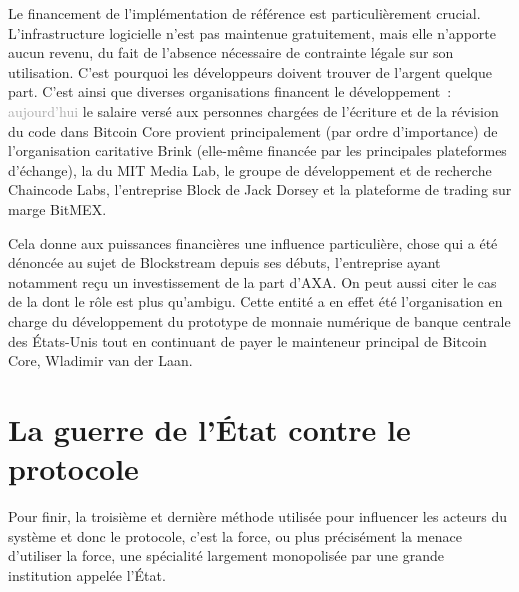 Le financement de l'implémentation de référence est particulièrement crucial. L'infrastructure logicielle n'est pas maintenue gratuitement, mais elle n'apporte aucun revenu, du fait de l'absence nécessaire de contrainte légale sur son utilisation. C'est pourquoi les développeurs doivent trouver de l'argent quelque part. C'est ainsi que diverses organisations financent le développement~: \textcolor{darkgray}{aujourd'hui} le salaire versé aux personnes chargées de l'écriture et de la révision du code dans Bitcoin Core provient principalement (par ordre d'importance) de l'organisation caritative Brink (elle-même financée par les principales plateformes d'échange), la  du MIT Media Lab, le groupe de développement et de recherche Chaincode Labs, l'entreprise Block de Jack Dorsey et la plateforme de trading sur marge BitMEX. %

Cela donne aux puissances financières une influence particulière, chose qui a été dénoncée au sujet de Blockstream depuis ses débuts, l'entreprise ayant notamment reçu un investissement de la part d'AXA. On peut aussi citer le cas de la  dont le rôle est plus qu'ambigu. Cette entité a en effet été l'organisation en charge du développement du prototype de monnaie numérique de banque centrale des États-Unis tout en continuant de payer le mainteneur principal de Bitcoin Core, Wladimir van der Laan.

\section*{La guerre de l'État contre le protocole} %

Pour finir, la troisième et dernière méthode utilisée pour influencer les acteurs du système et donc le protocole, c'est la force, ou plus précisément la menace d'utiliser la force, une spécialité largement monopolisée par une grande institution appelée l'État.

